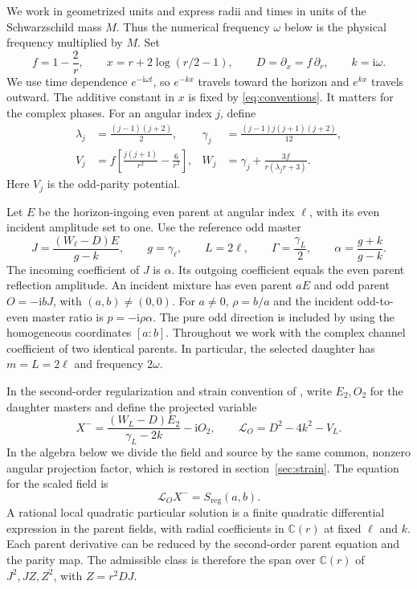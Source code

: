 \documentclass[11pt]{article}
\newcommand{\ii}{\mathrm{i}}
\begin{document}
We work in geometrized units and express radii and times in units of the Schwarzschild mass \(M\).
Thus the numerical frequency \(\omega\) below is the physical frequency multiplied by \(M\).
Set
\begin{equation}
 f=1-\frac{2}{r},\qquad
 x=r+2\log(r/2-1),\qquad
 D=\partial_x=f\,\partial_r,\qquad k=\ii\omega.
 \label{eq:conventions}
\end{equation}
We use time dependence \(e^{-\ii\omega t}\), so \(e^{-kx}\) travels toward the horizon and \(e^{kx}\) travels outward.
The additive constant in \(x\) is fixed by \eqref{eq:conventions}.
It matters for the complex phases.
For an angular index \(j\), define
\begin{align}
 \lambda_j&=\frac{(j-1)(j+2)}{2},
 &\gamma_j&=\frac{(j-1)j(j+1)(j+2)}{12},\\
 V_j&=f\left[\frac{j(j+1)}{r^2}-\frac{6}{r^3}\right],
 &W_j&=\gamma_j+\frac{3f}{r(\lambda_jr+3)} .
 \label{eq:parity}
\end{align}
Here \(V_j\) is the odd-parity potential.

Let \(E\) be the horizon-ingoing even parent at angular index \(\ell\), with its even incident amplitude set to one.
Use the reference odd master
\begin{equation}
 J=\frac{(W_\ell-D)E}{g-k},\qquad
 g=\gamma_\ell,\qquad L=2\ell,\qquad
 \Gamma=\frac{\gamma_L}{2},\qquad
 \alpha=\frac{g+k}{g-k}.
 \label{eq:darbourx}
\end{equation}
The incoming coefficient of \(J\) is \(\alpha\).
Its outgoing coefficient equals the even parent reflection amplitude.
An incident mixture has even parent \(aE\) and odd parent \(O=-\ii bJ\), with \((a,b)\ne(0,0)\).
For \(a\ne0\), \(\rho=b/a\) and the incident odd-to-even master ratio is \(p=-\ii\rho\alpha\).
The pure odd direction is included by using the homogeneous coordinates \([a:b]\).
Throughout we work with the complex channel coefficient of two identical parents. In particular, the selected daughter has \(m=L=2\ell\) and frequency \(2\omega\).

In the second-order regularization and strain convention of \cite{bucciotti}, write \(E_2,O_2\) for the daughter masters and define the projected variable
\begin{equation}
 X^-=\frac{(W_L-D)E_2}{\gamma_L-2k}-\ii O_2,\qquad
 \mathcal L_O=D^2-4k^2-V_L .
 \label{eq:daughter}
\end{equation}
In the algebra below we divide the field and source by the same common, nonzero angular projection factor, which is restored in section~\ref{sec:strain}.
The equation for the scaled field is
\begin{equation}
 \mathcal L_O X^-=S_{\mathrm{reg}}(a,b).
 \label{eq:forced}
\end{equation}
A rational local quadratic particular solution is a finite quadratic differential expression in the parent fields, with radial coefficients in \(\mathbb C(r)\) at fixed \(\ell\) and \(k\).
Each parent derivative can be reduced by the second-order parent equation and the parity map.
The admissible class is therefore the span over \(\mathbb C(r)\) of \(J^2,JZ,Z^2\), with \(Z=r^2DJ\).
\end{document}
